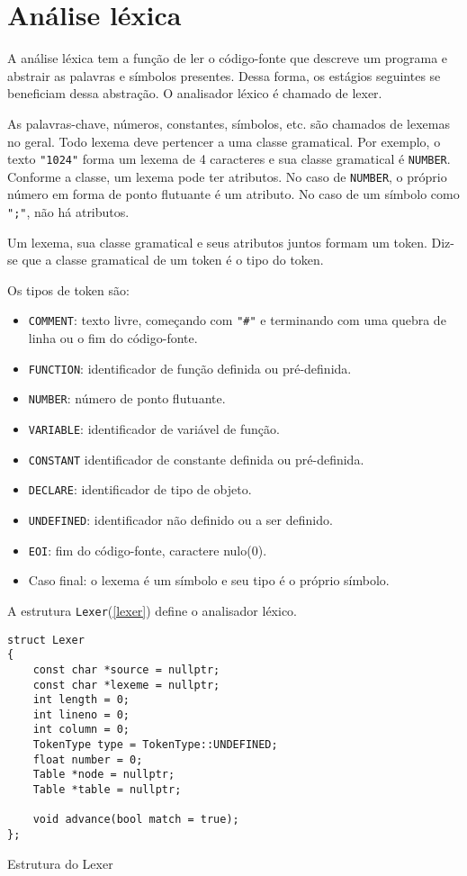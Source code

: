 \documentclass[10pt,a4paper]{article}
\newenvironment{code}{\captionsetup{type=listing}}{}
\begin{document}
\newpage
\section{Análise léxica}
A análise léxica tem a função de ler o código-fonte que descreve um programa e abstrair as palavras e símbolos presentes.
Dessa forma, os estágios seguintes se beneficiam dessa abstração. O analisador léxico é chamado de lexer.

As palavras-chave, números, constantes, símbolos, etc. são chamados de lexemas no geral.
Todo lexema deve pertencer a uma classe gramatical.
Por exemplo, o texto \texttt{"1024"} forma um lexema de 4 caracteres e sua classe gramatical é \texttt{NUMBER}.
Conforme a classe, um lexema pode ter atributos.
No caso de \texttt{NUMBER}, o próprio número em forma de ponto flutuante é um atributo.
No caso de um símbolo como \texttt{";"}, não há atributos.

Um lexema, sua classe gramatical e seus atributos juntos formam um token.
Diz-se que a classe gramatical de um token é o tipo do token.

Os tipos de token são:
\begin{itemize}
\item \texttt{COMMENT}: texto livre, começando com \texttt{"\#"} e
terminando com uma quebra de linha ou o fim do código-fonte.
\item \texttt{FUNCTION}: identificador de função definida ou pré-definida.
\item \texttt{NUMBER}: número de ponto flutuante.
\item \texttt{VARIABLE}: identificador de variável de função.
\item \texttt{CONSTANT} identificador de constante definida ou pré-definida.
\item \texttt{DECLARE}: identificador de tipo de objeto.
\item \texttt{UNDEFINED}: identificador não definido ou a ser definido.
\item \texttt{EOI}: fim do código-fonte, caractere nulo(0).
\item Caso final: o lexema é um símbolo e seu tipo é o próprio símbolo.

\end{itemize}

A estrutura \texttt{Lexer}(\ref{lexer}) define o analisador léxico.
\begin{code}
\begin{verbatim}
struct Lexer
{
    const char *source = nullptr;
    const char *lexeme = nullptr;
    int length = 0;
    int lineno = 0;
    int column = 0;
    TokenType type = TokenType::UNDEFINED;
    float number = 0;
    Table *node = nullptr;
    Table *table = nullptr;

    void advance(bool match = true);
};
\end{verbatim}
\caption{Estrutura do Lexer}
\label{lexer}
\end{code}
\end{document}
